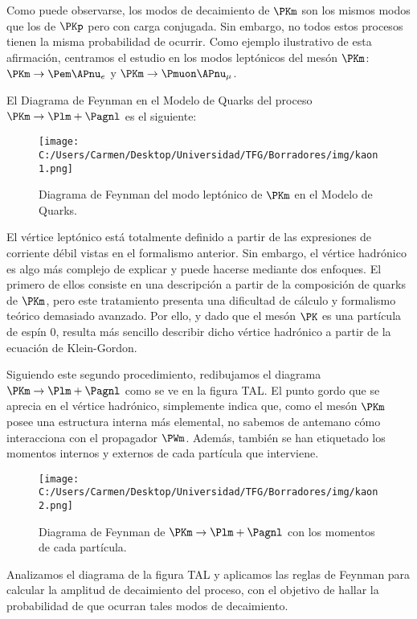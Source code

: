Como puede observarse, los modos de decaimiento de $\PKm$ son los mismos modos que los de $\PKp$ pero con carga conjugada. Sin embargo, no todos estos procesos tienen la misma probabilidad de ocurrir. Como ejemplo ilustrativo de esta afirmación, centramos el estudio en los modos leptónicos del mesón $\PKm$: $\PKm \rightarrow \Pem \APnu_{e}$ y $\PKm \rightarrow \Pmuon \APnu_{\mu}$.

El Diagrama de Feynman en el Modelo de Quarks del proceso $\PKm \rightarrow \Plm + \Pagnl$ es el siguiente:

\begin{figure}[ht!]
	\centering
	\texttt{[image: C:/Users/Carmen/Desktop/Universidad/TFG/Borradores/img/kaon1.png]}
	\caption[Diagrama de Feynman de quarks de $\PKm \rightarrow \Plm + \Pagnl$]
	{Diagrama de Feynman del modo leptónico de $\PKm$ en el Modelo de Quarks.}
	\label{fig:diagrama1}
\end{figure}

El vértice leptónico está totalmente definido a partir de las expresiones de corriente débil vistas en el formalismo anterior. Sin embargo, el vértice hadrónico es algo más complejo de explicar y puede hacerse mediante dos enfoques. El primero de ellos consiste en una descripción a partir de la composición de quarks de $\PKm$, pero este tratamiento presenta una dificultad de cálculo y formalismo teórico demasiado avanzado. Por ello, y dado que el mesón $\PK$ es una partícula de espín 0, resulta más sencillo describir dicho vértice hadrónico a partir de la ecuación de Klein-Gordon.

Siguiendo este segundo procedimiento, redibujamos el diagrama $\PKm \rightarrow \Plm + \Pagnl$ como se ve en la figura TAL. El punto gordo que se aprecia en el vértice hadrónico, simplemente indica que, como el mesón $\PKm$ posee una estructura interna más elemental, no sabemos de antemano cómo  interacciona con el propagador $\PWm$. Además, también se han etiquetado los momentos internos y externos de cada partícula que interviene.

\begin{figure}[ht!]
	\centering
	\texttt{[image: C:/Users/Carmen/Desktop/Universidad/TFG/Borradores/img/kaon2.png]}
	\caption[Diagrama de Feynman de $\PKm \rightarrow \Plm + \Pagnl$ con los momentos]
	{Diagrama de Feynman de $\PKm \rightarrow \Plm + \Pagnl$ con los momentos de cada partícula.}
	\label{fig:diagrama2}
\end{figure}

Analizamos el diagrama de la figura TAL y aplicamos las reglas de Feynman para calcular la amplitud de decaimiento del proceso, con el objetivo de hallar la probabilidad de que ocurran tales modos de decaimiento. 
